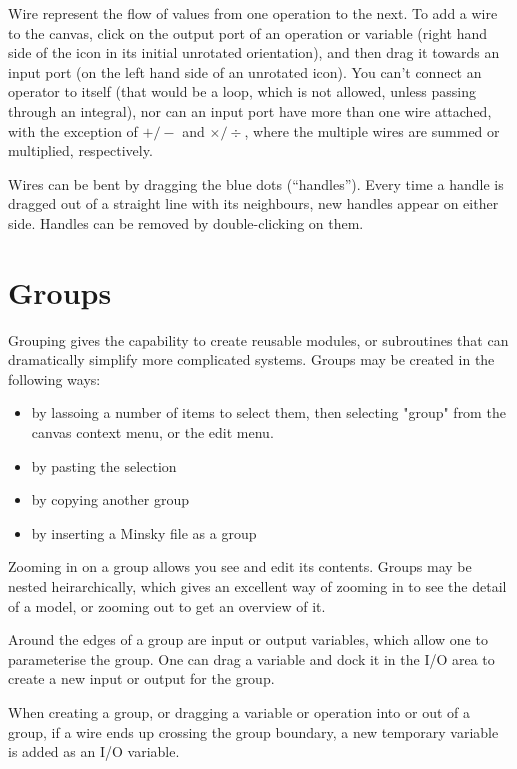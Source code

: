 Wire represent the flow of values from one operation to the next. To
add a wire to the canvas, click on the output port of an operation or
variable (right hand side of the icon in its initial unrotated
orientation), and then drag it towards an input port (on the left hand
side of an unrotated icon). You can't connect an operator to itself
(that would be a loop, which is not allowed, unless passing through an
integral), nor can an input port have more than one wire
attached, with the exception of $+/-$ and $\times/\div$, where the
multiple wires are summed or multiplied, respectively.

Wires can be bent by dragging the blue dots (``handles''). Every time
a handle is dragged out of a straight line with its neighbours, new
handles appear on either side. Handles can be removed by
double-clicking on them.

\section{Groups}\label{group}

Grouping gives the capability to create reusable modules, or subroutines that
can dramatically simplify more complicated systems. Groups may be
created in the following ways:
\begin{itemize}
\item by lassoing a number of items to select them, then selecting
"group" from the canvas context menu, or the edit menu.
\item by pasting the selection
\item by copying another group
\item by inserting a Minsky file as a group
\end{itemize}

Zooming in on a group allows you see and edit its contents. Groups may
be nested heirarchically, which gives an excellent way of zooming in
to see the detail of a model, or zooming out to get an overview of it.

Around the edges of a group are input or output variables, which allow
one to parameterise the group. One can drag a variable and dock it in
the I/O area to create a new input or output for the group.

When creating a group, or dragging a variable or operation into or out
of a group, if a wire ends up crossing the group boundary, a new
temporary variable is added as an I/O variable.

